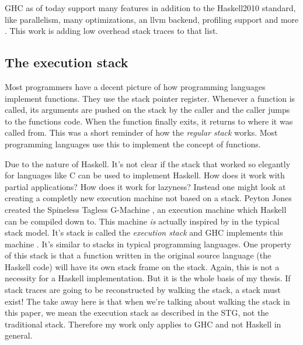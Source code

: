 GHC as of today support many features in addition to the Haskell2010
standard, like parallelism, many optimizations, an llvm backend, profiling
support and more \cite{ghc_website}. This
work is adding low overhead stack traces to that list.

\subsection{The execution stack}

Most programmers have a decent picture of how programming languages implement
functions. They use the stack pointer register. Whenever a function is called, its
arguments are pushed on the stack by the caller and the caller jumps to the
functions code. When the function finally exits, it returns to where it was
called from. This was a short reminder of how the \emph{regular stack} works.
Most programming languages use this to implement the concept of functions.

Due to the nature of Haskell. It's not clear if the stack that worked so
elegantly for languages like C can be used to implement Haskell. How does it
work with partial applications? How does it work for lazyness? Instead one
might look at creating a completly new execution machine not based on a stack.
Peyton Jones created the Spineless Tagless G-Machine \cite{stg_1992}, an
execution machine which Haskell can be compiled down to. This machine \emph{is}
actually inspired by in the typical stack model. It's stack is called the
\emph{execution stack} and GHC implements this machine \cite{evalapplyjfp06}.
It's similar to stacks in typical programming languages. One property of this
stack is that a function written in the original source language (the Haskell
code) will have its own stack frame on the stack. Again, this is not a
necessity for a Haskell implementation. But it is the whole basis of my thesis.
If stack traces are going to be reconstructed by walking the stack, a stack
must exist! The take away here is that when we're talking about walking the
stack in this paper, we mean the execution stack as described in the STG, not
the traditional stack. Therefore my work only applies to GHC and not Haskell in
general.


